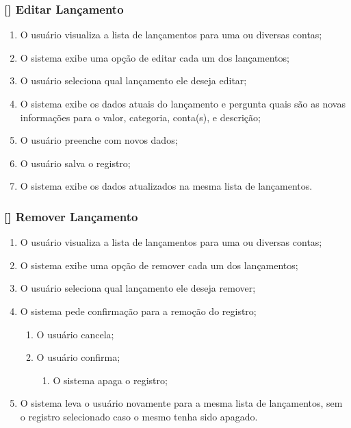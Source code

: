 \documentclass[a4paper]{abnt}
\begin{document}
\subsubsection{[\UC] Editar Lançamento}
\begin{enumerate}[itemsep=-1ex]
	\item O usuário visualiza a lista de lançamentos para uma ou diversas contas;
	\item O sistema exibe uma opção de editar cada um dos lançamentos;
	\item O usuário seleciona qual lançamento ele deseja editar;
	\item O sistema exibe os dados atuais do lançamento e pergunta quais são as novas informações para o valor, categoria, conta(s), e descrição;
	\item O usuário preenche com novos dados;
	\item O usuário salva o registro;
	\item O sistema exibe os dados atualizados na mesma lista de lançamentos.
\end{enumerate}

\subsubsection{[\UC] Remover Lançamento}
\begin{enumerate}[itemsep=-1ex]
	\item O usuário visualiza a lista de lançamentos para uma ou diversas contas;
	\item O sistema exibe uma opção de remover cada um dos lançamentos;
	\item O usuário seleciona qual lançamento ele deseja remover;
	\item O sistema pede confirmação para a remoção do registro;
		\begin{enumerate}[itemsep=-1ex,topsep=-1ex]
			\item O usuário cancela;
			\item O usuário confirma;
				\begin{enumerate}[itemsep=-1ex,topsep=-1ex]
					\item O sistema apaga o registro;
				\end{enumerate}
		\end{enumerate}
	\item O sistema leva o usuário novamente para a mesma lista de lançamentos, sem o registro selecionado caso o mesmo tenha sido apagado.
\end{enumerate}
\end{document}
